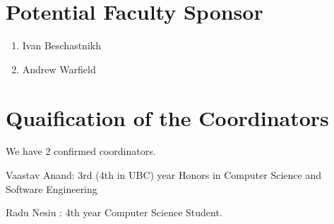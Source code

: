\documentclass[11pt]{article}
\begin{document}
\section{Potential Faculty Sponsor}

\begin{enumerate}
   \item Ivan Beschastnikh
   \item Andrew Warfield
\end{enumerate}

\section{Quaification of the Coordinators}

We have 2 confirmed coordinators.

Vaastav Anand: 3rd (4th in UBC) year Honors in Computer Science and Software Engineering

Radu Nesiu : 4th year Computer Science Student.
\end{document}
